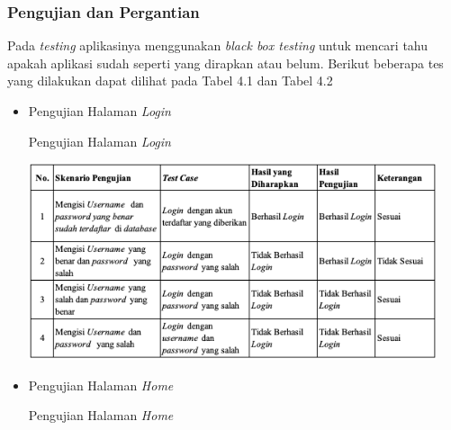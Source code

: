 \begin{flushleft}
\begin{justify}
\begin{enumerate}
\begin{itemize}
            \end{itemize}
        \end{enumerate}

            \subsubsection{Pengujian dan Pergantian}
            Pada \emph{testing} aplikasinya menggunakan \emph{black box testing} untuk mencari tahu apakah aplikasi 
            sudah seperti yang dirapkan atau belum. Berikut beberapa tes yang dilakukan dapat dilihat pada Tabel 4.1 dan Tabel 4.2
            \begin{itemize}
                \item Pengujian Halaman \emph{Login}
                \begin{table}[ht]
                    \centering
                    \caption{Pengujian Halaman \emph{Login}}
                    \includegraphics[width=12cm]{images/bab 4/fungsional-login.png}\\
                    \end{table}
                \item Pengujian Halaman \emph{Home}
                \begin{table}[ht]
                    \centering
                    \caption{Pengujian Halaman \emph{Home}}

\end{table}
\end{itemize}
\end{justify}
\end{flushleft}
